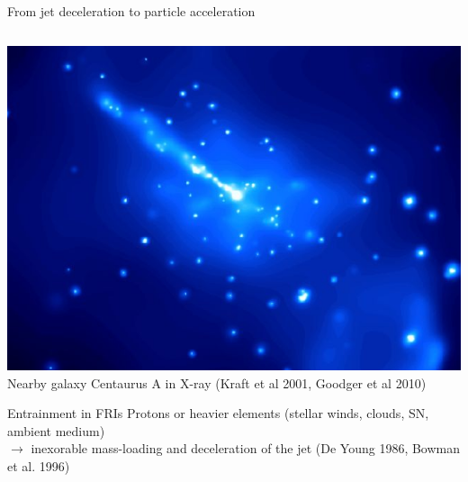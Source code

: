 \begin{frame}{From jet deceleration to particle acceleration}

		{\scriptsize
	\begin{columns}
		\begin{column}{0.5\textwidth}
			\centering
			\includegraphics[width=1.1\linewidth]{images/cena_jet.jpg}
			Nearby galaxy Centaurus A in X-ray (Kraft et al 2001, Goodger et al 2010)
				\begin{block}{Entrainment in FRIs}
				Protons or heavier elements (stellar winds, clouds, SN, ambient medium) \\
			    $\rightarrow$ inexorable mass-loading and deceleration
						of the jet (De Young 1986, Bowman et al. 1996)
			\end{block}


\end{column}
\end{columns}}
\end{frame}
